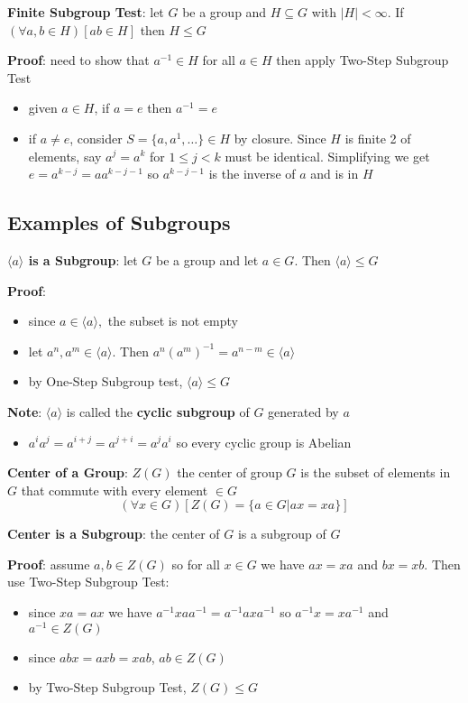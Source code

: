 \documentclass{article}
\begin{document}
  \textbf{Finite Subgroup Test}: let $G$ be a group and $H \subseteq G$ with $|H| < \infty$. If $(\forall a, b \in H)[ab \in H]$ then $H \leq G$

  \textbf{Proof}: need to show that $a^{-1} \in H$ for all $a \in H$ then apply Two-Step Subgroup Test
  \begin{itemize}
    \item given $a \in H$, if $a = e$ then $a^{-1} = e$
    \item if $a \neq e$, consider $S = \{a, a^1, \ldots\} \in H$ by closure. Since $H$ is finite 2 of elements, say $a^j = a^k$ for $1 \leq j < k$ must be identical. Simplifying we get $e = a^{k-j} = aa^{k-j-1}$ so $a^{k-j-1}$ is the inverse of $a$ and is in $H$
  \end{itemize}

  \subsection{Examples of Subgroups}
 \textbf{$\langle a \rangle$ is a Subgroup}: let $G$ be a group and let $a \in G$. Then $\langle a\rangle \leq G$

  \textbf{Proof}:
  \begin{itemize}
    \item since $a \in \langle a \rangle,$ the subset is not empty
    \item let $a^n, a^m \in \langle a \rangle$. Then $a^n(a^m)^{-1} = a^{n-m} \in \langle a \rangle$
    \item by One-Step Subgroup test, $\langle a \rangle \leq G$
  \end{itemize}

  \textbf{Note}: $\langle a \rangle$ is called the \textbf{cyclic subgroup} of $G$ generated by $a$
  \begin{itemize}
    \item $a^ia^j = a^{i+j} = a^{j+i} = a^ja^i$ so every cyclic group is Abelian
  \end{itemize}

  \bigskip

  \textbf{Center of a Group}: $Z(G)$ the center of group $G$ is the subset of elements in $G$ that commute with every element $\in G$
  \[(\forall x \in G) [Z(G) = \{a \in G | ax = xa\}]\]

  \textbf{Center is a Subgroup}: the center of $G$ is a subgroup of $G$

  \textbf{Proof}: assume $a, b \in Z(G)$ so for all $x \in G$ we have $ax = xa$ and $bx = xb$. Then use Two-Step Subgroup Test:
  \begin{itemize}
    \item since $xa = ax$ we have $a^{-1}xaa^{-1} = a^{-1}axa^{-1}$ so $a^{-1}x = xa^{-1}$ and $a^{-1} \in Z(G)$
    \item since $abx = axb = xab$, $ab \in Z(G)$
    \item by Two-Step Subgroup Test, $Z(G) \leq G$
  \end{itemize}
\end{document}
